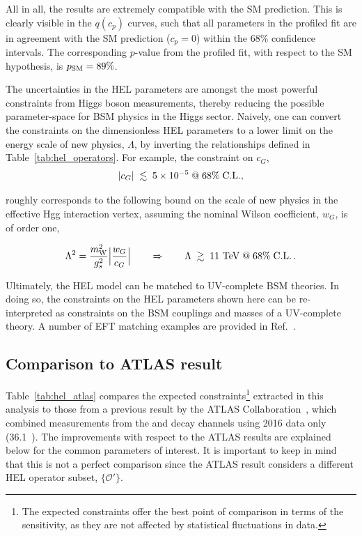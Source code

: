 All in all, the results are extremely compatible with the SM prediction. This is clearly visible in the $q(c_p)$ curves, such that all parameters in the profiled fit are in agreement with the SM prediction ($c_p=0$) within the 68\% confidence intervals. The corresponding $p$-value from the profiled fit, with respect to the SM hypothesis, is $p_{\rm{SM}}=89\%$. 

The uncertainties in the HEL parameters are amongst the most powerful constraints from Higgs boson measurements, thereby reducing the possible parameter-space for BSM physics in the Higgs sector. Naively, one can convert the constraints on the dimensionless HEL parameters to a lower limit on the energy scale of new physics, $\Lambda$, by inverting the relationships defined in Table~\ref{tab:hel_operators}. For example, the constraint on $c_G$,
\begin{equation}
    |c_G| \; \lesssim \; 5 \times 10^{-5} \; {\rm{@}} \; 68\% \; {\rm{C.L.}},
\end{equation}

\noindent
roughly corresponds to the following bound on the scale of new physics in the effective Hgg interaction vertex, assuming the nominal Wilson coefficient, $w_G$, is of order one,

\begin{equation}
    \Lambda^2 = \frac{m_{\rm{W}}^2}{g_s^2}\Big| \frac{w_G}{c_G} \Big| \qquad \Rightarrow \qquad \Lambda \; \gtrsim \; 11~{\rm{TeV}} \; {\rm{@}} \; 68\% \; {\rm{C.L.}}\,.
\end{equation}

\noindent
Ultimately, the HEL model can be matched to UV-complete BSM theories. In doing so, the constraints on the HEL parameters shown here can be re-interpreted as constraints on the BSM couplings and masses of a UV-complete theory. A number of EFT matching examples are provided in Ref.~\cite{Marzocca:2020jze}. 

\subsection{Comparison to ATLAS result}
Table~\ref{tab:hel_atlas} compares the expected constraints\footnote{The expected constraints offer the best point of comparison in terms of the sensitivity, as they are not affected by statistical fluctuations in data.} extracted in this analysis to those from a previous result by the ATLAS Collaboration~\cite{ATL-PHYS-PUB-2017-018}, which combined measurements from the \Hgg and \Hfl decay channels using 2016 data only (36.1~\fbinv). The improvements with respect to the ATLAS results are explained below for the common parameters of interest. It is important to keep in mind that this is not a perfect comparison since the ATLAS result considers a different HEL operator subset, $\{\mathcal{O}'\}$.


